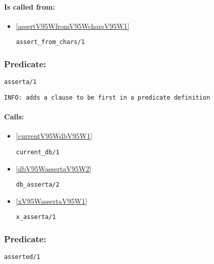 \paragraph{Is called from:} 
\begin{itemize}
\item \ref{assertV95WfromV95WcharsV95W1} 
\begin{verbatim}
assert_from_chars/1
\end{verbatim}

\end{itemize}

\subsubsection{Predicate:} \label{assertaV95W1}

\begin{verbatim}
asserta/1
\end{verbatim}

{\small \begin{verbatim}
INFO: adds a clause to be first in a predicate definition

\end{verbatim}}
\paragraph{Calls:} 
\begin{itemize}
\item \ref{currentV95WdbV95W1} 
\begin{verbatim}
current_db/1
\end{verbatim}

\item \ref{dbV95WassertaV95W2} 
\begin{verbatim}
db_asserta/2
\end{verbatim}

\item \ref{xV95WassertaV95W1} 
\begin{verbatim}
x_asserta/1
\end{verbatim}

\end{itemize}

\subsubsection{Predicate:} \label{assertedV95W1}

\begin{verbatim}
asserted/1
\end{verbatim}

